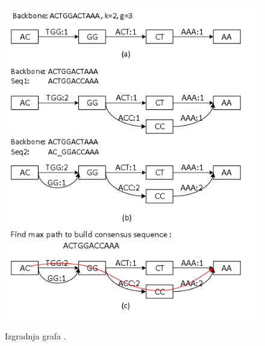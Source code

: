 \begin{figure}[htb]
\centering
\includegraphics[scale=0.6]{figures/sparc.png}
\caption{Izgradnja grafa \citep{ye2016sparc}.}
\label{fig:sparc}
\end{figure}


